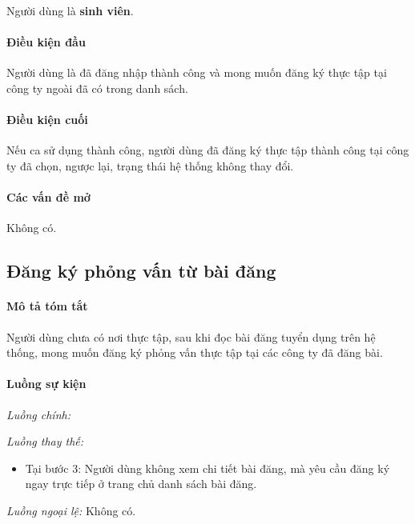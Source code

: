 \documentclass[./../main.tex]{subfiles}
\begin{document}
Người dùng là \textbf{sinh viên}.

\paragraph*{Điều kiện đầu}

Người dùng là đã đăng nhập thành công và mong muốn đăng ký thực tập tại
công ty ngoài đã có trong danh sách.

\paragraph*{Điều kiện cuối}

Nếu ca sử dụng thành công, người dùng đã đăng ký thực tập thành công tại
công ty đã chọn, ngược lại, trạng thái hệ thống không thay đổi.

\paragraph*{Các vấn đề mở}

Không có.

\subsection{Đăng ký phỏng vấn từ bài đăng}

\paragraph*{Mô tả tóm tắt}

Người dùng chưa có nơi thực tập, sau khi đọc bài đăng tuyển dụng trên hệ
thống, mong muốn đăng ký phỏng vấn thực tập tại các công ty đã đăng bài.

\paragraph*{Luồng sự kiện}

\emph{Luồng chính:}

\emph{Luồng thay thế:}

\begin{itemize}
\item
  
  Tại bước 3: Người dùng không xem chi tiết bài đăng, mà yêu cầu đăng ký
  ngay trực tiếp ở trang chủ danh sách bài đăng.
  
\end{itemize}

\emph{Luồng ngoại lệ:} Không có.
\end{document}
